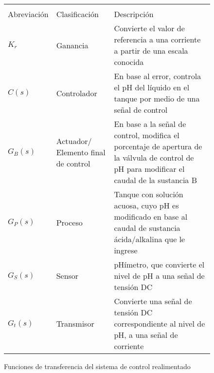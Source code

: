 \begin{figure}[!h]
    \centering
    \setlength\extrarowheight{3mm}
    \begin{tabular}{p{3cm}p{3cm}p{10cm}}
        \toprule\\[-2.5em]
        Abreviación & Clasificación & Descripción\\
        \midrule
        $K_r$ & Ganancia & Convierte el valor de referencia a una corriente a partir de una escala conocida\\
        $C(s)$ & Controlador & En base al error, controla el pH del líquido en el tanque por medio de una señal de control\\
        $G_B(s)$ & Actuador/ \newline Elemento final de control & En base a la señal de control, modifica el porcentaje de apertura de la válvula de control de pH para modificar el caudal de la sustancia B\\
        $G_P(s)$ & Proceso & Tanque con solución acuosa, cuyo pH es modificado en base al caudal de sustancia ácida/alkalina que le ingrese\\
        $G_S(s)$ & Sensor & pHímetro, que convierte el nivel de pH a una señal de tensión DC\\
        $G_t(s)$ & Transmisor & Convierte una señal de tensión DC correspondiente al nivel de pH, a una señal de corriente\\
        \bottomrule
    \end{tabular}
    \caption{Funciones de transferencia del sistema de control realimentado}
    \label{t1}
\end{figure}

